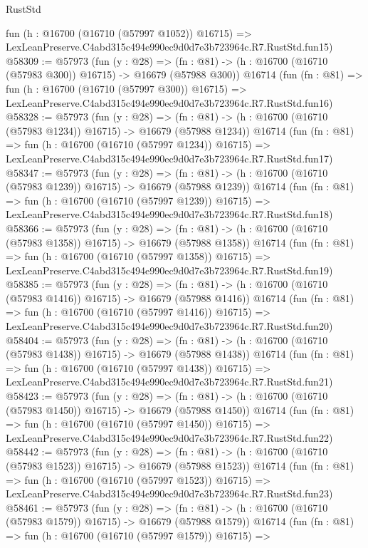 \begin{lexlean}{RustStd}
\begin{coremodule}
    fun (h : @16700 (@16710 (@57997 @1052)) @16715) =>
    LexLeanPreserve.C4abd315c494e990ec9d0d7e3b723964c.R7.RustStd.fun15)
@58309 := @57973
    (fun (y : @28) =>
    (fn : @81) -> (h : @16700 (@16710 (@57983 @300)) @16715) -> @16679 (@57988 @300))
    @16714
    (fun (fn : @81) =>
    fun (h : @16700 (@16710 (@57997 @300)) @16715) =>
    LexLeanPreserve.C4abd315c494e990ec9d0d7e3b723964c.R7.RustStd.fun16)
@58328 := @57973
    (fun (y : @28) =>
    (fn : @81) -> (h : @16700 (@16710 (@57983 @1234)) @16715) -> @16679 (@57988 @1234))
    @16714
    (fun (fn : @81) =>
    fun (h : @16700 (@16710 (@57997 @1234)) @16715) =>
    LexLeanPreserve.C4abd315c494e990ec9d0d7e3b723964c.R7.RustStd.fun17)
@58347 := @57973
    (fun (y : @28) =>
    (fn : @81) -> (h : @16700 (@16710 (@57983 @1239)) @16715) -> @16679 (@57988 @1239))
    @16714
    (fun (fn : @81) =>
    fun (h : @16700 (@16710 (@57997 @1239)) @16715) =>
    LexLeanPreserve.C4abd315c494e990ec9d0d7e3b723964c.R7.RustStd.fun18)
@58366 := @57973
    (fun (y : @28) =>
    (fn : @81) -> (h : @16700 (@16710 (@57983 @1358)) @16715) -> @16679 (@57988 @1358))
    @16714
    (fun (fn : @81) =>
    fun (h : @16700 (@16710 (@57997 @1358)) @16715) =>
    LexLeanPreserve.C4abd315c494e990ec9d0d7e3b723964c.R7.RustStd.fun19)
@58385 := @57973
    (fun (y : @28) =>
    (fn : @81) -> (h : @16700 (@16710 (@57983 @1416)) @16715) -> @16679 (@57988 @1416))
    @16714
    (fun (fn : @81) =>
    fun (h : @16700 (@16710 (@57997 @1416)) @16715) =>
    LexLeanPreserve.C4abd315c494e990ec9d0d7e3b723964c.R7.RustStd.fun20)
@58404 := @57973
    (fun (y : @28) =>
    (fn : @81) -> (h : @16700 (@16710 (@57983 @1438)) @16715) -> @16679 (@57988 @1438))
    @16714
    (fun (fn : @81) =>
    fun (h : @16700 (@16710 (@57997 @1438)) @16715) =>
    LexLeanPreserve.C4abd315c494e990ec9d0d7e3b723964c.R7.RustStd.fun21)
@58423 := @57973
    (fun (y : @28) =>
    (fn : @81) -> (h : @16700 (@16710 (@57983 @1450)) @16715) -> @16679 (@57988 @1450))
    @16714
    (fun (fn : @81) =>
    fun (h : @16700 (@16710 (@57997 @1450)) @16715) =>
    LexLeanPreserve.C4abd315c494e990ec9d0d7e3b723964c.R7.RustStd.fun22)
@58442 := @57973
    (fun (y : @28) =>
    (fn : @81) -> (h : @16700 (@16710 (@57983 @1523)) @16715) -> @16679 (@57988 @1523))
    @16714
    (fun (fn : @81) =>
    fun (h : @16700 (@16710 (@57997 @1523)) @16715) =>
    LexLeanPreserve.C4abd315c494e990ec9d0d7e3b723964c.R7.RustStd.fun23)
@58461 := @57973
    (fun (y : @28) =>
    (fn : @81) -> (h : @16700 (@16710 (@57983 @1579)) @16715) -> @16679 (@57988 @1579))
    @16714
    (fun (fn : @81) =>
    fun (h : @16700 (@16710 (@57997 @1579)) @16715) =>

\end{coremodule}
\end{lexlean}
